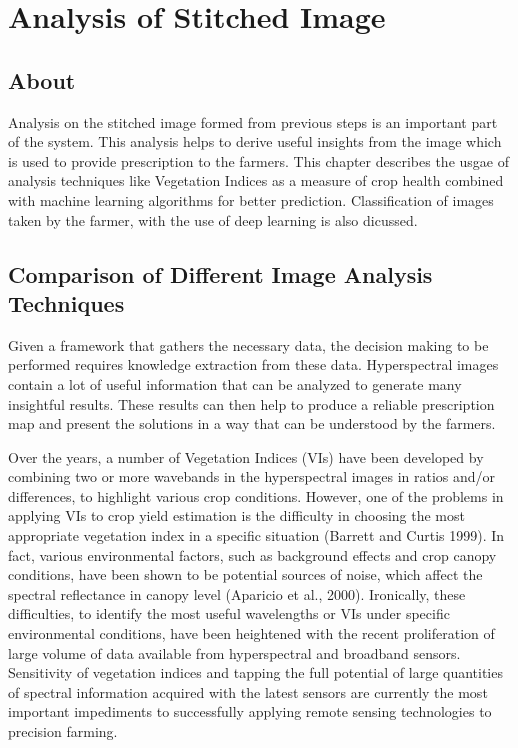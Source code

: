 \chapter{Analysis of Stitched Image}

\section{About}
Analysis on the stitched image formed from previous steps is an important part of the system. This analysis helps to derive useful insights from the image which is used to provide prescription to the farmers.
This chapter describes the usgae of analysis techniques like Vegetation Indices as a measure of crop health combined with machine learning algorithms for better prediction. Classification of images taken by the farmer, with the use of deep learning is also dicussed. 
 
\section{Comparison of Different Image Analysis Techniques}
Given a framework that gathers the necessary data, the decision making to be performed requires knowledge extraction from these data. Hyperspectral images contain a lot of useful information that can be analyzed to generate many insightful results. These results can then help to produce a reliable prescription map and present the solutions in a way that can be understood by the farmers.

Over the years, a number of Vegetation Indices (VIs) have been developed by combining two or more wavebands in the hyperspectral images in ratios and/or differences, to highlight various crop conditions. However, one of the problems in applying VIs to crop yield estimation is the difficulty in choosing the most appropriate vegetation index in a specific situation (Barrett and Curtis 1999). In fact, various environmental factors, such as background effects and crop canopy conditions, have been shown to be potential sources of noise, which affect the spectral reflectance in canopy level (Aparicio et al., 2000). Ironically, these difficulties, to identify the most useful wavelengths or VIs under specific environmental conditions, have been heightened with the recent proliferation of large volume of data available from hyperspectral and broadband sensors. Sensitivity of vegetation indices and tapping the full potential of large quantities of spectral information acquired with the latest sensors are currently the most important impediments to successfully applying remote sensing technologies to precision farming.

